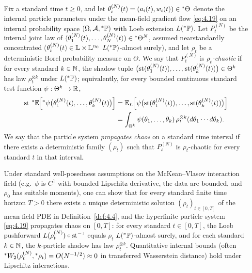 \begin{definition}[Chaos]\label{def:4.3}
Fix a standard time $t \ge 0$, and let $\theta_i^{(N)}(t) = (a_i(t), w_i(t)) \in {}^*\Theta$ denote the internal particle parameters under the mean-field gradient flow \eqref{eq:4.19} on an internal probability space $(\Omega, \mathcal{A}, {}^*\mathbb{P})$ with Loeb extension $L({}^*\mathbb{P})$. Let $P_t^{(N)}$ be the internal joint law of $(\theta_1^{(N)}(t), \dots, \theta_N^{(N)}(t)) \in {}^*\Theta^N$, assumed nearstandardly concentrated ($\theta_i^{(N)}(t) \in \mathbb{L} \times \mathbb{L}^{n_0}$ $L({}^*\mathbb{P})$-almost surely), and let $\rho_t$ be a deterministic Borel probability measure on $\Theta$. We say that $P_t^{(N)}$ is \emph{$\rho_t$-chaotic} if for every standard $k \in \mathbb{N}$, the shadow tuple $\bigl(\operatorname{st}(\theta_1^{(N)}(t)), \dots, \operatorname{st}(\theta_k^{(N)}(t))\bigr) \in \Theta^k$ has law $\rho_t^{\otimes k}$ under $L({}^*\mathbb{P})$; equivalently, for every bounded continuous standard test function $\psi : \Theta^k \to \mathbb{R}$,
\begin{equation}\label{eq:4.20}
\begin{aligned}
\operatorname{st}\,{}^*\mathbb{E}\Bigl[{}^*\psi\bigl(\theta_1^{(N)}(t), \dots, \theta_k^{(N)}(t)\bigr)\Bigr] &= \mathbb{E}_L\Bigl[\psi\bigl(\operatorname{st}(\theta_1^{(N)}(t)), \dots, \operatorname{st}(\theta_k^{(N)}(t))\bigr)\Bigr] \\
&= \int_{\Theta^k} \psi(\theta_1, \dots, \theta_k)\,\rho_t^{\otimes k}(d\theta_1 \cdots d\theta_k).
\end{aligned}
\end{equation}
We say that the particle system \emph{propagates chaos} on a standard time interval if there exists a deterministic family $(\rho_t)$ such that $P_t^{(N)}$ is $\rho_t$-chaotic for every standard $t$ in that interval.
\end{definition}

Under standard well-posedness assumptions on the McKean--Vlasov interaction field (e.g.\ $\phi$ is $C^1$ with bounded Lipschitz derivative, the data are bounded, and $\rho_0$ has suitable moments), one can show that for every standard finite time horizon $T > 0$ there exists a unique deterministic solution $(\rho_t)_{t \in [0, T]}$ of the mean-field PDE in Definition~\ref{def:4.4}, and the hyperfinite particle system \eqref{eq:4.19} propagates chaos on $[0, T]$: for every standard $t \in [0, T]$, the Loeb pushforward $L(\rho_t^{(N)}) \circ \operatorname{st}^{-1}$ equals $\rho_t$ $L({}^*\mathbb{P})$-almost surely, and for each standard $k \in \mathbb{N}$, the $k$-particle shadow has law $\rho_t^{\otimes k}$. Quantitative internal bounds (often ${}^*W_2(\rho_t^{(N)}, {}^*\rho_t) = O(N^{-1/2}) \approx 0$ in transferred Wasserstein distance) hold under Lipschitz interactions.


